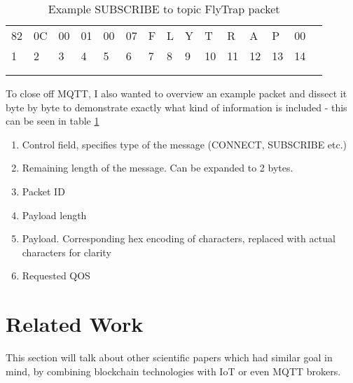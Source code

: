 \begin{table}[h]
\centering
\begin{tabular}{lllllllllllllll}
\cline{1-14}
\multicolumn{1}{|l|}{82} & \multicolumn{1}{l|}{0C} & \multicolumn{1}{l|}{00} & \multicolumn{1}{l|}{01} & \multicolumn{1}{l|}{00} & \multicolumn{1}{l|}{07} & \multicolumn{1}{l|}{F} & \multicolumn{1}{l|}{L} & \multicolumn{1}{l|}{Y} & \multicolumn{1}{l|}{T} & \multicolumn{1}{l|}{R} & \multicolumn{1}{l|}{A} & \multicolumn{1}{l|}{P} & \multicolumn{1}{l|}{00} &  \\ \cline{1-14}
1                        & 2                       & 3                       & 4                       & 5                       & 6                       & 7                      & 8                      & 9                      & 10                     & 11                     & 12                     & 13                     & 14                      &  \\
                         &                         &                         &                         &                         &                         &                        &                        &                        &                        &                        &                        &                        &                         &  \\
                         &                         &                         &                         &                         &                         &                        &                        &                        &                        &                        &                        &                        &                         & 
\end{tabular}
\caption{Example SUBSCRIBE to topic FlyTrap packet}
\label{tab:sub_packet}
\end{table}

To close off MQTT, I also wanted to overview an example packet and dissect it byte by byte to demonstrate exactly what kind of information is included - this can be seen in table \ref{tab:sub_packet}
\begin{enumerate}
  \item [1] Control field, specifies type of the message (CONNECT, SUBSCRIBE etc.)
  \item [2] Remaining length of the message. Can be expanded to 2 bytes.
  \item [3-4] Packet ID
  \item [5-6] Payload length
  \item [7-13] Payload. Corresponding hex encoding of characters, replaced with actual characters for clarity
  \item [14] Requested QOS
\end{enumerate}


\section{Related Work}
This section will talk about other scientific papers which had similar goal in mind, by combining  blockchain technologies with IoT or even MQTT brokers.

